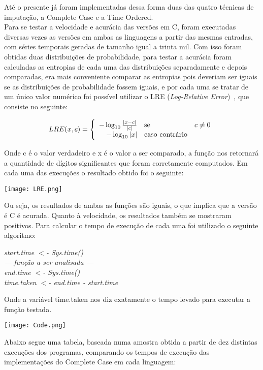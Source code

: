 \documentclass{article}
\begin{document}
Até o presente já foram implementadas dessa forma duas das quatro técnicas de imputação, a Complete Case e a Time Ordered. \\
Para se testar a velocidade e acurácia das versões em C, foram executadas diversas vezes as versões em ambas as linguagens a partir das mesmas entradas, com séries temporais geradas de tamanho igual a trinta mil. Com isso foram obtidas duas distribuições de probabilidade, para testar a acurácia foram calculadas as entropias de cada uma das distribuições separadamente e depois comparadas, era mais conveniente comparar as entropias pois deveriam ser iguais se as distribuições de probabilidade fossem iguais, e por cada uma se tratar de um único valor numérico foi possível utilizar o LRE (\textit{Log-Relative Error})~\cite{almiron2010numerical}, que consiste no seguinte:

$$ LRE(x,c)
= \left\{\begin{array}{rll}
- \log_{10} \frac{|x-c|}{|c|} & \hbox{se} & c \neq 0 \\
- \log_{10} |x| & \hbox{caso contrário}
\end{array}\right.$$

Onde c é o valor verdadeiro e x é o valor a ser comparado, a função nos retornará a quantidade de dígitos significantes que foram corretamente computados. Em cada uma das execuções o resultado obtido foi o seguinte:

    
\texttt{[image: LRE.png]}


Ou seja, os resultados de ambas as funções são iguais, o que implica que a versão é C é acurada.
Quanto à velocidade, os resultados também se mostraram positivos. Para calcular o tempo de execução de cada uma foi utilizado o seguinte algoritmo:
    
\begin{flushleft}
\textit{start.time $<$- Sys.time()\\
--- função a ser analisada ---\\
end.time $<$- Sys.time()\\
time.taken $<$- end.time - start.time\\}
\end{flushleft}

Onde a variável time.taken nos diz exatamente o tempo levado para executar a função testada.

\texttt{[image: Code.png]}

Abaixo segue uma tabela, baseada numa amostra obtida a partir de dez distintas execuções dos programas, comparando os tempos de execução das implementações do Complete Case em cada linguagem:\\
\end{document}
